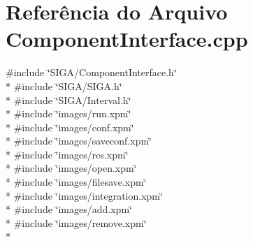 \section{Referência do Arquivo Component\+Interface.\+cpp}
\label{_component_interface_8cpp}
{\ttfamily \#include \char`\"{}S\+I\+G\+A/\+Component\+Interface.\+h\char`\"{}}\\*
{\ttfamily \#include \char`\"{}S\+I\+G\+A/\+S\+I\+G\+A.\+h\char`\"{}}\\*
{\ttfamily \#include \char`\"{}S\+I\+G\+A/\+Interval.\+h\char`\"{}}\\*
{\ttfamily \#include \char`\"{}images/run.\+xpm\char`\"{}}\\*
{\ttfamily \#include \char`\"{}images/conf.\+xpm\char`\"{}}\\*
{\ttfamily \#include \char`\"{}images/saveconf.\+xpm\char`\"{}}\\*
{\ttfamily \#include \char`\"{}images/res.\+xpm\char`\"{}}\\*
{\ttfamily \#include \char`\"{}images/open.\+xpm\char`\"{}}\\*
{\ttfamily \#include \char`\"{}images/filesave.\+xpm\char`\"{}}\\*
{\ttfamily \#include \char`\"{}images/integration.\+xpm\char`\"{}}\\*
{\ttfamily \#include \char`\"{}images/add.\+xpm\char`\"{}}\\*
{\ttfamily \#include \char`\"{}images/remove.\+xpm\char`\"{}}\\*
